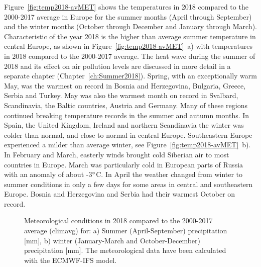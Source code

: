 Figure~\ref{fig:temp2018-avMET} shows the temperatures in 2018 compared to the 2000-2017 average in Europe for the summer months (April through September) and the winter months (October through December and January through March). 
Characteristic of the year 2018 is the higher than average summer temperature in central Europe, as shown in Figure~\ref{fig:temp2018-avMET}~a) with temperatures in 2018 compared to the 2000-2017 average. The heat wave during the summer of 2018 and its effect on air pollution levels are discussed in more detail in a separate chapter (Chapter~\ref{ch:Summer2018}). Spring, with an exceptionally warm May, was the warmest on record in Bosnia and Herzegovina, Bulgaria, Greece, Serbia and Turkey. May was also the warmest month on record in Svalbard, Scandinavia, the Baltic countries, Austria and Germany. Many of these regions continued breaking temperature records in the summer and autumn months.
In Spain, the United Kingdom, Ireland and northern Scandinavia the winter was colder than normal, and close to normal in central Europe. Southeastern Europe experienced a milder than average winter, see Figure~\ref{fig:temp2018-avMET}~b). In February and March, easterly winds brought cold Siberian air to most countries in Europe. March was particularly cold in European parts of Russia with an anomaly of about -3$^\circ$C. In April the weather changed from winter to summer conditions in only a few days for some areas in central and southeastern Europe. 
Bosnia and Herzegovina and Serbia had their warmest October on record.

\begin{figure}[H]
  \centering
  \caption{Meteorological conditions in 2018 compared to the 2000-2017 average (climavg) for: a) Summer (April-September) precipitation [mm], b) winter (January-March and October-December) precipitation [mm]. The meteorological data have been calculated with the ECMWF-IFS model.} 
\label{fig:prec2017-avMET}
\end{figure}

